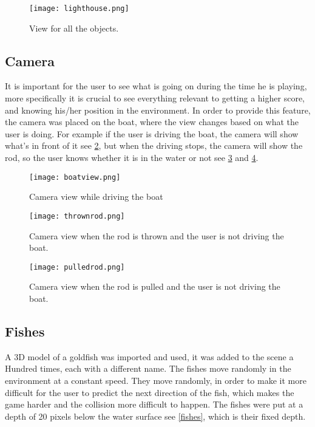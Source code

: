 \documentclass[paper=a4, fontsize=11pt]{scrartcl} %
\numberwithin{equation}{section} %
\numberwithin{figure}{section} %
\numberwithin{table}{section} %
\begin{document}
\begin{figure}[!ht]
\centering
\texttt{[image: lighthouse.png]}
\caption{View for all the objects.}
\label{house}
\end{figure}
\newpage

\subsection{Camera}

It is important for the user to see what is going on during the time he is playing, more specifically it is crucial to see everything relevant to getting a higher score, and knowing his/her position in the environment. In order to provide this feature, the camera was placed on the boat, where the view changes based on what the user is doing. For example if the user is driving the boat, the camera will show what's in front of it see \ref{boat view}, but when the driving stops, the camera will show the rod, so the user knows whether it is in the water or not see \ref{Drod} and \ref{Urod}.

\begin{figure}[!ht]
\centering
\texttt{[image: boatview.png]}
\caption{Camera view while driving the boat}
\label{boat view}
\end{figure}

\begin{figure}[!ht]
\centering
\texttt{[image: thrownrod.png]}
\caption{Camera view when the rod is thrown and the user is not driving the boat.}
\label{Drod}
\end{figure}

\begin{figure}[!ht]
\centering
\texttt{[image: pulledrod.png]}
\caption{Camera view when the rod is pulled and the user is not driving the boat.}
\label{Urod}
\end{figure}

\newpage
\subsection{Fishes}

A 3D model of a goldfish was imported and used, it was added to the scene a Hundred times, each with a different name. The fishes move randomly in the environment at a constant speed. They move randomly, in order to make it more difficult for the user to predict the next direction of the fish, which makes the game harder and the collision more difficult to happen. The fishes were put at a depth of 20 pixels below the water surface see \ref{fishes}, which is their fixed depth. 
\end{document}
